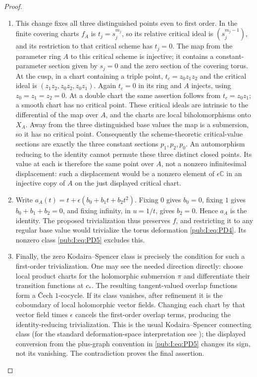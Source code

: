 \begin{proof}
\begin{enumerate}[label=\arabic*.,leftmargin=*]
\item This change fixes all three distinguished points even to first order.
In the finite covering charts
$f_A$ is $t_j=s_j^{m_j}$, so its relative critical ideal is
$(s_j^{m_j-1})$, and its restriction to that critical scheme has
$t_j=0$. The map from the parameter ring $A$ to this critical
scheme is injective; it contains a constant-parameter section given
by $s_j=0$ and the zero section of the covering torus.
At the cusp, in a chart containing a triple point,
$t_c=z_0z_1z_2$ and the critical ideal is
$(z_1z_2,z_0z_2,z_0z_1)$. Again $t_c=0$ in its ring and $A$ injects,
using $z_0=z_1=z_2=0$. At a double chart the same assertion follows
from $t_c=z_0z_1$; a smooth chart has no critical point.
These critical ideals are intrinsic to the differential of the map
over $A$, and the charts are local biholomorphisms onto $X_A$.
Away from the three distinguished base values the map is a
submersion, so it has no critical point.
Consequently the scheme-theoretic critical-value sections are exactly
the three constant sections $p_1,p_2,p_0$. An automorphism reducing
to the identity cannot permute these three distinct closed points.
Its value at each is therefore the same point over $A$, not a
nonzero infinitesimal displacement: such a displacement would be a
nonzero element of $\epsilon\mathbb C$ in an injective copy of $A$
on the just displayed critical chart.

\item Write $a_A(t)=t+\epsilon(b_0+b_1t+b_2t^2)$.
Fixing $0$ gives $b_0=0$, fixing $1$ gives $b_0+b_1+b_2=0$,
and fixing infinity, in $u=1/t$, gives $b_2=0$.
Hence $a_A$ is the identity. The proposed trivialization thus
preserves $f$, and restricting it to any regular base value would
trivialize the torus deformation \eqref{pub:I:eq:PD4}. Its nonzero class \eqref{pub:I:eq:PD5}
excludes this.

\item Finally, the zero Kodaira--Spencer class is precisely the condition for
such a first-order trivialization. One may see the needed direction
directly: choose local product charts for the holomorphic submersion
$\pi$ and differentiate their transition functions at $c_*$. The
resulting tangent-valued overlap functions form a \v Cech $1$-cocycle.
If its class vanishes, after refinement it is the coboundary of local
holomorphic vector fields. Changing each chart by that vector field
times $\epsilon$ cancels the first-order overlap terms, producing
the identity-reducing trivialization. This is the usual
Kodaira--Spencer connecting class (for the standard deformation-space
interpretation see \cite[Section~67, p.~15]{McMullen1996Complex});
the displayed conversion
from the plus-graph convention in \eqref{pub:I:eq:PD5} changes its sign, not its
vanishing. The contradiction proves the final assertion.
\end{enumerate}
\end{proof}
